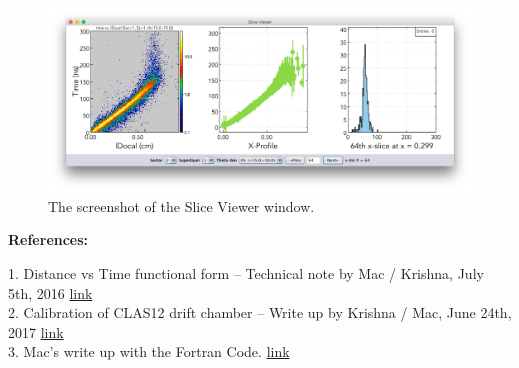 \documentclass[12pt]{article}
\begin{document}
\begin{figure} [H] %
    \centering
    \includegraphics[width=1.0\textwidth]{Figures/Screenshots/screenShotSliceViewer.png}
    \caption{The screenshot of the Slice Viewer window.}
    \label{fSliceViewer}
\end{figure}

\textbf{References:}

1. Distance vs Time functional form -- Technical note by Mac / Krishna, July 5th, 2016 \href{https://clasweb.jlab.org/wiki/images/f/f9/Tvsx-function.pdf}{link}\\
2. Calibration of CLAS12 drift chamber -- Write up by Krishna / Mac, June 24th, 2017 \href{https://userweb.jlab.org/%7Eadhikari/CLAS12software/DC/Released/dcCalibration.pdf}{link}\\
3. Mac's write up with the Fortran Code. \href{https://clasweb.jlab.org/wiki/images/8/81/Txfunc-parameters.txt}{link} 


      
\end{document}

